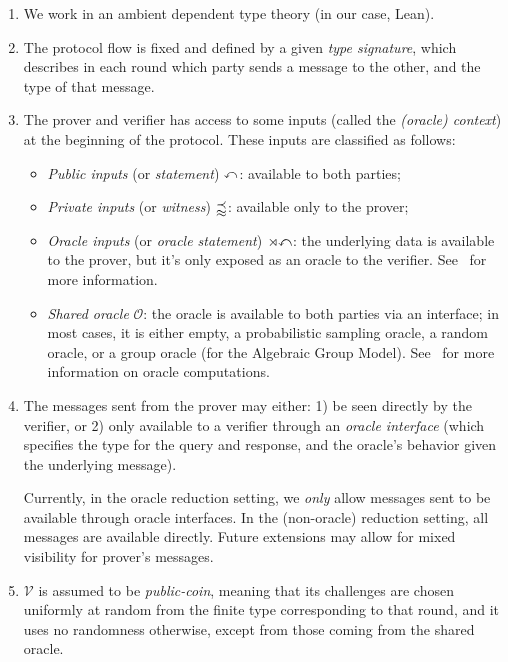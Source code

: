 \begin{enumerate}
    \item We work in an ambient dependent type theory (in our case, Lean).

    \item The protocol flow is fixed and defined by a given \emph{type signature}, which
    describes in each round which party sends a message to the other, and the type of that message.

    \item The prover and verifier has access to some inputs (called the \emph{(oracle) context}) at
    the beginning of the protocol. These inputs are classified as follows:
    \begin{itemize}
        \item \emph{Public inputs} (or \emph{statement}) $\mathbbm{x}$: available to both parties;
        \item \emph{Private inputs} (or \emph{witness}) $\mathbbm{w}$: available only to the prover;
        \item \emph{Oracle inputs} (or \emph{oracle statement}) $\mathbbm{ox}$: the underlying data
        is available to the prover, but it's only exposed as an oracle to the verifier. See~ for more information.
        \item \emph{Shared oracle} $\mathcal{O}$: the oracle is available to both parties via an
        interface; in most cases, it is either empty, a probabilistic sampling oracle, a random
        oracle, or a group oracle (for the Algebraic Group Model). See~ for more
        information on oracle computations.
    \end{itemize}

    \item The messages sent from the prover may either: 1) be seen directly by the verifier, or 2)
    only available to a verifier through an \emph{oracle interface} (which specifies the type for
    the query and response, and the oracle's behavior given the underlying message).

    Currently, in the oracle reduction setting, we \emph{only} allow messages sent to be available
    through oracle interfaces. In the (non-oracle) reduction setting, all messages are available
    directly. Future extensions may allow for mixed visibility for prover's messages.

    \item $\mathcal{V}$ is assumed to be \emph{public-coin}, meaning that its challenges are chosen
    uniformly at random from the finite type corresponding to that round, and it uses no randomness
    otherwise, except from those coming from the shared oracle.


\end{enumerate}

